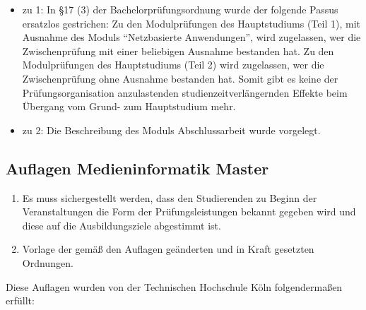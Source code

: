 \begin{itemize}
\tightlist
\item
  zu 1: In §17 (3) der Bachelorprüfungsordnung wurde der folgende Passus
  ersatzlos gestrichen: Zu den Modulprüfungen des Hauptstudiums (Teil
  1), mit Ausnahme des Moduls ``Netzbasierte Anwendungen'', wird
  zugelassen, wer die Zwischenprüfung mit einer beliebigen Ausnahme
  bestanden hat. Zu den Modulprüfungen des Hauptstudiums (Teil 2) wird
  zugelassen, wer die Zwischenprüfung ohne Ausnahme bestanden hat. Somit
  gibt es keine der Prüfungsorganisation anzulastenden
  studienzeitverlängernden Effekte beim Übergang vom Grund- zum
  Hauptstudium mehr.
\item
  zu 2: Die Beschreibung des Moduls Abschlussarbeit wurde vorgelegt.
\end{itemize}

\subsection{Auflagen Medieninformatik
Master}\label{auflagen-medieninformatik-master}

\begin{siderules}
\begin{enumerate}
\def\labelenumi{\arabic{enumi}.}
\tightlist
\item
  Es muss sichergestellt werden, dass den Studierenden zu Beginn der
  Veranstaltungen die Form der Prüfungsleistungen bekannt gegeben wird
  und diese auf die Ausbildungsziele abgestimmt ist.
\item
  Vorlage der gemäß den Auflagen geänderten und in Kraft gesetzten
  Ordnungen.
\end{enumerate}
\end{siderules}

Diese Auflagen wurden von der Technischen Hochschule Köln folgendermaßen
erfüllt:

